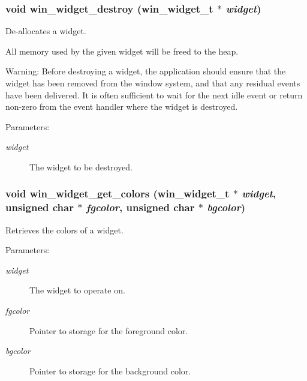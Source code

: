 \subsubsection{\setlength{\rightskip}{0pt plus 5cm}void win\_\-widget\_\-destroy ({\bf win\_\-widget\_\-t} $\ast$ {\em widget})}\label{winwidget_8h_a2}


De-allocates a widget. 

All memory used by the given widget will be freed to the heap.

\begin{Desc}
\item[Warning:]Before destroying a widget, the application should ensure that the widget has been removed from the window system, and that any residual events have been delivered. It is often sufficient to wait for the next idle event or return non-zero from the event handler where the widget is destroyed.\end{Desc}
\begin{Desc}
\item[Parameters:]
\begin{description}
\item[{\em widget}]The widget to be destroyed. \end{description}
\end{Desc}
\subsubsection{\setlength{\rightskip}{0pt plus 5cm}void win\_\-widget\_\-get\_\-colors ({\bf win\_\-widget\_\-t} $\ast$ {\em widget}, unsigned char $\ast$ {\em fgcolor}, unsigned char $\ast$ {\em bgcolor})}\label{winwidget_8h_a14}


Retrieves the colors of a widget. 

\begin{Desc}
\item[Parameters:]
\begin{description}
\item[{\em widget}]The widget to operate on. \item[{\em fgcolor}]Pointer to storage for the foreground color. \item[{\em bgcolor}]Pointer to storage for the background color. \end{description}
\end{Desc}
